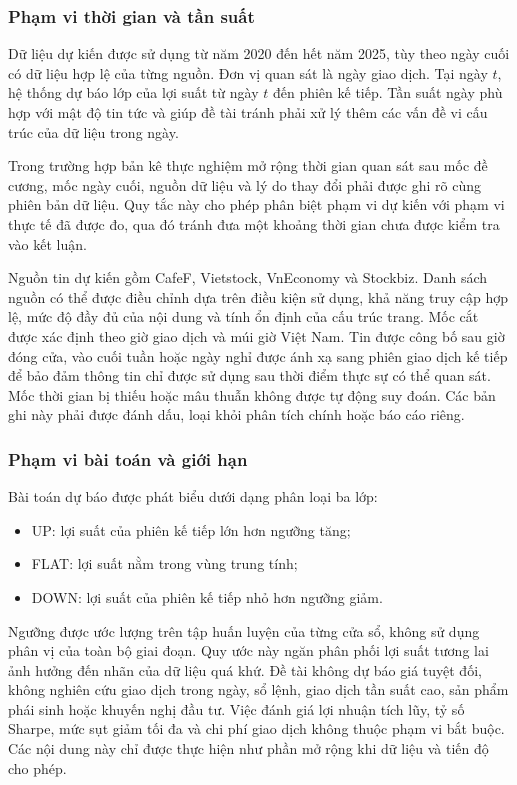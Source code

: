 \documentclass[12pt, a4paper, oneside]{report}
\begin{document}
\subsubsection{Phạm vi thời gian và tần suất}

Dữ liệu dự kiến được sử dụng từ năm 2020 đến hết năm 2025, tùy theo ngày cuối có dữ liệu
hợp lệ của từng nguồn. Đơn vị quan sát là ngày giao dịch. Tại ngày $t$, hệ thống dự báo lớp
của lợi suất từ ngày $t$ đến phiên kế tiếp. Tần suất ngày phù hợp với mật độ tin tức và
giúp đề tài tránh phải xử lý thêm các vấn đề vi cấu trúc của dữ liệu trong ngày.

Trong trường hợp bản kê thực nghiệm mở rộng thời gian quan sát sau mốc đề cương,
mốc ngày cuối, nguồn dữ liệu và lý do thay đổi phải được ghi rõ cùng phiên bản dữ liệu.
Quy tắc này cho phép phân biệt phạm vi dự kiến với phạm vi thực tế đã được đo, qua đó
tránh đưa một khoảng thời gian chưa được kiểm tra vào kết luận.

Nguồn tin dự kiến gồm CafeF, Vietstock, VnEconomy và Stockbiz. Danh sách nguồn có thể
được điều chỉnh dựa trên điều kiện sử dụng, khả năng truy cập hợp lệ, mức độ đầy đủ
của nội dung và tính ổn định của cấu trúc trang. Mốc cắt được xác định theo giờ giao
dịch và múi giờ Việt Nam. Tin được công bố sau giờ đóng cửa, vào cuối tuần hoặc ngày nghỉ
được ánh xạ sang phiên giao dịch kế tiếp để bảo đảm thông tin chỉ được sử dụng sau thời điểm
thực sự có thể quan sát. Mốc thời gian bị thiếu hoặc mâu thuẫn không được tự động suy đoán.
Các bản ghi này phải được đánh dấu, loại khỏi phân tích chính hoặc báo cáo riêng.

\subsubsection{Phạm vi bài toán và giới hạn}

Bài toán dự báo được phát biểu dưới dạng phân loại ba lớp:

\begin{itemize}[nosep]
  \item UP: lợi suất của phiên kế tiếp lớn hơn ngưỡng tăng;
  \item FLAT: lợi suất nằm trong vùng trung tính;
  \item DOWN: lợi suất của phiên kế tiếp nhỏ hơn ngưỡng giảm.
\end{itemize}

Ngưỡng được ước lượng trên tập huấn luyện của từng cửa sổ, không sử dụng phân vị của toàn
bộ giai đoạn. Quy ước này ngăn phân phối lợi suất tương lai ảnh hưởng đến nhãn của dữ liệu
quá khứ. Đề tài không dự báo giá tuyệt đối, không nghiên cứu giao dịch trong ngày, sổ lệnh,
giao dịch tần suất cao, sản phẩm phái sinh hoặc khuyến nghị đầu tư. Việc đánh giá lợi
nhuận tích lũy, tỷ số Sharpe, mức sụt giảm tối đa và chi phí giao dịch không thuộc phạm
vi bắt buộc. Các nội dung này chỉ được thực hiện như phần mở rộng khi dữ liệu và tiến
độ cho phép.
\end{document}
